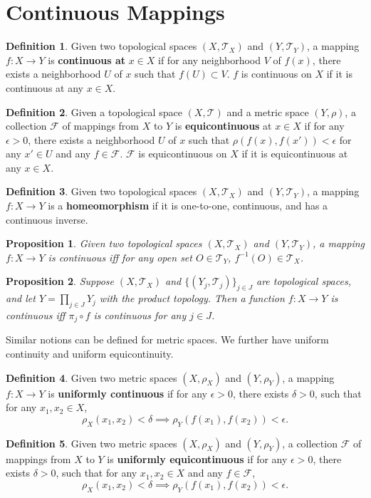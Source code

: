 \documentclass[openany]{book}
\newtheorem{proposition}{Proposition}[chapter]
\theoremstyle{definition}
\newtheorem{definition}{Definition}[chapter]
\theoremstyle{remark}
\begin{document}
\section{Continuous Mappings}
\begin{definition}
    Given two topological spaces $(X,\mathcal{T}_X)$ and $(Y,\mathcal{T}_Y)$, a mapping $f:X\to Y$ is \textbf{continuous at} $x\in X$ if for any neighborhood $V$ of $f(x)$, there exists a neighborhood $U$ of $x$ such that $f(U)\subset V$. $f$ is continuous on $X$ if it is continuous at any $x\in X$.
\end{definition}
\begin{definition}
    Given a topological space $(X,\mathcal{T})$ and a metric space $(Y,\rho)$, a collection $\mathcal{F}$ of mappings from $X$ to $Y$ is \textbf{equicontinuous} at $x\in X$ if for any $\epsilon>0$, there exists a neighborhood $U$ of $x$ such that $\rho(f(x),f(x'))<\epsilon$ for any $x'\in U$ and any $f\in \mathcal{F}$. $\mathcal{F}$ is equicontinuous on $X$ if it is equicontinuous at any $x\in X$.
\end{definition}
\begin{definition}
    Given two topological spaces $(X,\mathcal{T}_X)$ and $(Y,\mathcal{T}_Y)$, a mapping $f:X\to Y$ is a \textbf{homeomorphism} if it is one-to-one, continuous, and has a continuous inverse.
\end{definition}
\begin{proposition}
    Given two topological spaces $(X,\mathcal{T}_X)$ and $(Y,\mathcal{T}_Y)$, a mapping $f:X\to Y$ is continuous iff for any open set $O\in \mathcal{T}_Y$, $f^{-1}(O)\in \mathcal{T}_X$.
\end{proposition}
\begin{proposition}
    Suppose $(X,\mathcal{T}_X)$ and $\{(Y_j,\mathcal{T}_j)\}_{j\in J}$ are topological spaces, and let $Y=\prod_{j\in J}Y_j$ with the product topology. Then a function $f:X\to Y$ is continuous iff $\pi_j\circ f$ is continuous for any $j\in J$.
\end{proposition}

Similar notions can be defined for metric spaces. We further have uniform continuity and uniform equicontinuity.
\begin{definition}
    Given two metric spaces $(X,\rho_X)$ and $(Y,\rho_Y)$, a mapping $f:X\to Y$ is \textbf{uniformly continuous} if for any $\epsilon>0$, there exists $\delta>0$, such that for any $x_1,x_2\in X$,
    \begin{equation*}
        \rho_X(x_1,x_2)<\delta\implies\rho_Y(f(x_1),f(x_2))<\epsilon.
    \end{equation*}
\end{definition}
\begin{definition}
    Given two metric spaces $(X,\rho_X)$ and $(Y,\rho_Y)$, a collection $\mathcal{F}$ of mappings from $X$ to $Y$ is \textbf{uniformly equicontinuous} if for any $\epsilon>0$, there exists $\delta>0$, such that for any $x_1,x_2\in X$ and any $f\in \mathcal{F}$,
    \begin{equation*}
        \rho_X(x_1,x_2)<\delta\implies\rho_Y(f(x_1),f(x_2))<\epsilon.
    \end{equation*}
\end{definition}
\end{document}
